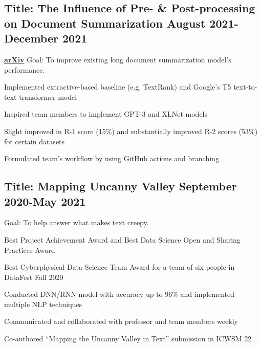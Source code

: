 \documentclass[11pt]{article}
\begin{document}
\subsection*{Title: The Influence of Pre- \& Post-processing on Document Summarization \hfill {\normalfont August
        2021-December 2021}}
\noindent
\href{https://github.com/Anthonyive/csci-544-project.git}{}  \href{https://www.youtube.com/watch?v=oVIVtOPeWEs}{} \href{https://arxiv.org/abs/2112.01660}{\textbf{arXiv}} Goal: To improve existing long document summarization model's performance.
\begin{compactitem}
    \item Implemented extractive-based baseline (e.g. TextRank) and Google's T5 text-to-text transformer model
    \item Inspired team members to implement GPT-3 and XLNet models
    \item Slight improved in R-1 score (15\%) and substantially improved R-2 scores (53\%) for certain datasets
    \item Formulated team's workflow by using GitHub actions and branching
\end{compactitem}
\vspace{0.1in}

\subsection*{Title: Mapping Uncanny Valley \hfill {\normalfont September
        2020-May 2021}}
\noindent
\href{https://github.com/Anthonyive/Research-Mapping-Uncanny-Valley.git}{} Goal: To help answer what makes text creepy.
\begin{compactitem}
    \item Best Project Achievement Award and Best Data Science Open and
    Sharing Practices Award
    \item Best Cyberphysical Data Science Team Award for a team of six people
    in DataFest Fall 2020
    \item Conducted DNN/RNN model with accuracy up to 96\% and implemented
    multiple NLP techniques
    \item Communicated and collaborated with professor and team members weekly
    \item Co-authored ``Mapping the Uncanny Valley in Text'' submission in
    ICWSM 22
\end{compactitem}
\vspace{0.1in}
\end{document}
